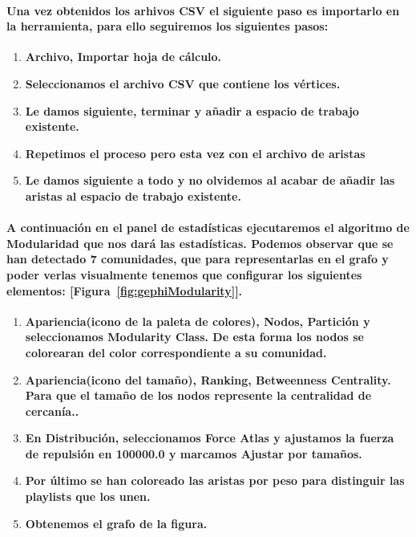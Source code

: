 \documentclass[11pt,spanish]{article}
\begin{document}
\paragraph*{Una vez obtenidos los arhivos CSV el siguiente paso es importarlo en la herramienta, para ello seguiremos los siguientes pasos:}
\begin{enumerate}
	\item \textbf{Archivo, Importar hoja de cálculo.}
	\item \textbf{Seleccionamos el archivo CSV que contiene los vértices.}
	\item \textbf{Le damos siguiente, terminar y añadir a espacio de trabajo existente.}
	\item \textbf{Repetimos el proceso pero esta vez con el archivo de aristas}
	\item \textbf{Le damos siguiente a todo y no olvidemos al acabar de añadir las aristas al espacio de trabajo existente.}
\end{enumerate}

\paragraph*{A continuación en el panel de estadísticas ejecutaremos el algoritmo de Modularidad que nos dará las estadísticas. 
Podemos observar que se han detectado 7 comunidades, que para representarlas en el grafo y poder verlas visualmente tenemos que configurar los siguientes elementos: [Figura~\ref{fig:gephiModularity}].}
\begin{enumerate}
	\item \textbf{Apariencia(icono de la paleta de colores), Nodos, Partición y seleccionamos Modularity Class. De esta forma los nodos se colorearan del color correspondiente a su comunidad.}
	\item \textbf{Apariencia(icono del tamaño), Ranking, Betweenness Centrality. Para que el tamaño de los nodos represente la centralidad de cercanía..}
	\item \textbf{En Distribución, seleccionamos Force Atlas y ajustamos la fuerza de repulsión en 100000.0 y marcamos Ajustar por tamaños.}
	\item \textbf{Por último se han coloreado las aristas por peso para distinguir las playlists que los unen.}
	\item \textbf{Obtenemos el grafo de la figura. }
\end{enumerate}
\end{document}
